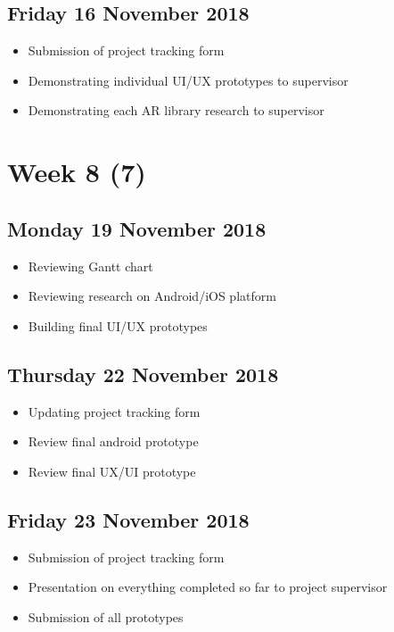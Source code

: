 \subsection*{Friday 16 November 2018}
\begin{itemize}
    \item Submission of project tracking form
	\item Demonstrating individual UI/UX prototypes to supervisor
	\item Demonstrating each AR library research to supervisor
\end{itemize}

\section*{Week 8 (7)}
\subsection*{Monday 19 November 2018}
\begin{itemize}
	\item Reviewing Gantt chart
	\item Reviewing research on Android/iOS platform
	\item Building final UI/UX prototypes
\end{itemize}

\subsection*{Thursday 22 November 2018}
\begin{itemize}
    \item Updating project tracking form
	\item Review final android prototype
	\item Review final UX/UI prototype
\end{itemize}

\subsection*{Friday 23 November 2018}
\begin{itemize}
    \item Submission of project tracking form
	\item Presentation on everything completed so far to project supervisor
	\item Submission of all prototypes
\end{itemize}

